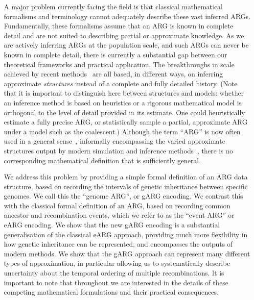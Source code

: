 \documentclass{article}
\begin{document}
A major problem currently facing the field is that
classical mathematical formalisms and terminology
cannot adequately describe these vast inferred ARGs.
Fundamentally, these formalisms assume that an
ARG is known in complete detail
and are not suited to describing partial or approximate knowledge.
As we are actively inferring ARGs at the population scale,
and such ARGs can never be known in complete detail,
there is currently a substantial gap between our theoretical frameworks
and practical application.
The breakthroughs in scale achieved by recent
methods~\citep[e.g.][]{kelleher2019inferring,speidel2019method,zhang2023biobank}
are all based, in different ways, on inferring
approximate \emph{structures}
instead of a complete and fully detailed history.
(Note that it is important to distinguish here between
structures and models: whether an inference method is based
on heuristics or a rigorous mathematical model is orthogonal
to the level of detail provided in its estimate.
One could heuristically estimate a fully precise ARG,
or statistically sample a partial,
approximate ARG under a model
such as the coalescent.)
Although the term ``ARG'' is now often used in a general
sense~\citep[e.g.][]{mathieson2020ancestry,hejase2020summary,
schaefer2021ancestral,harris2023using,zhang2023biobank,fan2023likelihood},
informally
encompassing the varied approximate structures output by modern simulation and
inference methods~\citep{rasmussen2014genome, palamara2016argon, haller2018tree,
kelleher2019inferring, speidel2019method, baumdicker2021efficient,
zhang2023biobank},
there is no corresponding mathematical definition
that is sufficiently general.

We address this problem by providing a simple formal definition of an
ARG data structure, based on recording the intervals of
genetic inheritance between specific genomes.
We call this the ``genome ARG'', or gARG encoding. We
contrast this with the classical formal definition of an ARG, based on
recording common ancestor and recombination events, which we refer to as the
``event ARG'' or eARG encoding. We show that the new gARG encoding is a
substantial generalisation of the classical eARG approach,  providing much more
flexibility in how genetic inheritance can be represented, and encompasses the
outputs of modern methods. We show that the gARG approach can represent many
different types of approximation, in particular allowing us to systematically
describe uncertainty about the temporal ordering of multiple recombinations. It
is important to note that throughout we are interested in the details of these
competing mathematical formulations and their practical consequences.
\end{document}
